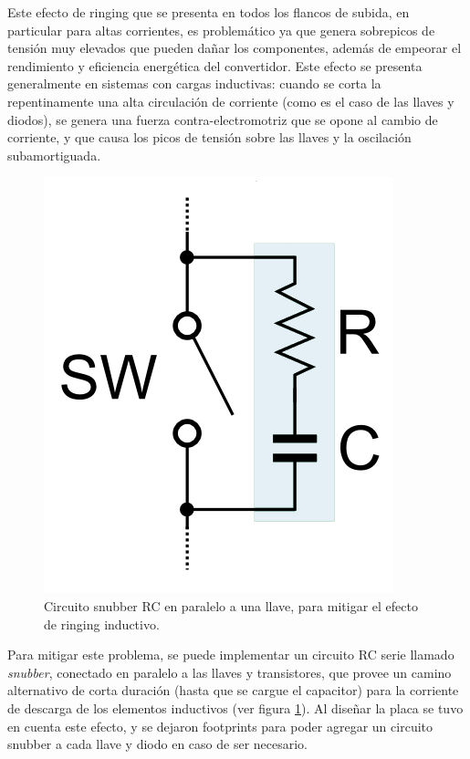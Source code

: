 Este efecto de ringing que se presenta en todos los flancos de subida, en particular para altas corrientes, es problemático ya que genera sobrepicos de tensión muy elevados que pueden dañar los componentes, además de empeorar el rendimiento y eficiencia energética del convertidor. Este efecto se presenta generalmente en sistemas con cargas inductivas: cuando se corta la repentinamente una alta circulación de corriente (como es el caso de las llaves y diodos), se genera una fuerza contra-electromotriz que se opone al cambio de corriente, y que causa los picos de tensión sobre las llaves y la oscilación subamortiguada.\\

\begin{figure}[h]
    \centering
    \includegraphics[scale=0.2]{Imagenes/Snubber RC.png}
    \caption{Circuito snubber RC en paralelo a una llave, para mitigar el efecto de ringing inductivo.}
    \label{snubber_rc}
\end{figure}

Para mitigar este problema, se puede implementar un circuito RC serie llamado \textit{snubber}, conectado en paralelo a las llaves y transistores, que provee un camino alternativo de corta duración (hasta que se cargue el capacitor) para la corriente de descarga de los elementos inductivos (ver figura \ref{snubber_rc}). Al diseñar la placa se tuvo en cuenta este efecto, y se dejaron footprints para poder agregar un circuito snubber a cada llave y diodo en caso de ser necesario.\\